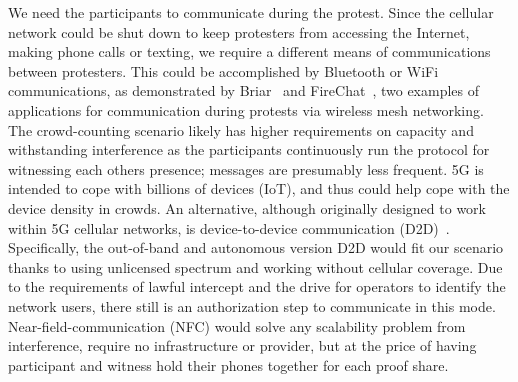 We need the participants to communicate during the protest.
Since the cellular network could be shut down to keep protesters from accessing 
the Internet, making phone calls or texting, we require a different means of 
communications between protesters. This could be accomplished by Bluetooth or 
WiFi communications, as demonstrated by Briar~\cite{Briar} and 
FireChat~\cite{FireChat}, two examples of applications for communication during 
protests via wireless mesh networking. The crowd-counting scenario likely has 
higher requirements on capacity and withstanding interference as the 
participants continuously run the protocol for witnessing each others presence; 
messages are presumably less frequent. 5G is intended to cope with billions of 
devices (IoT), and thus could help cope with the device density in crowds.
An alternative, although originally designed to work within 5G cellular networks, is device-to-device communication (D2D)~\cite{D2D}. 
Specifically, the out-of-band and autonomous version D2D would fit our
scenario thanks to using unlicensed spectrum and working without
cellular coverage. Due to the requirements of lawful intercept and the
drive for operators to identify the network users, there still is an
authorization step to communicate in this
mode. Near-field-communication (NFC) would
solve any scalability problem from interference, require no
infrastructure or provider, but at the price of having
participant and witness hold their phones together for each proof
share. 
